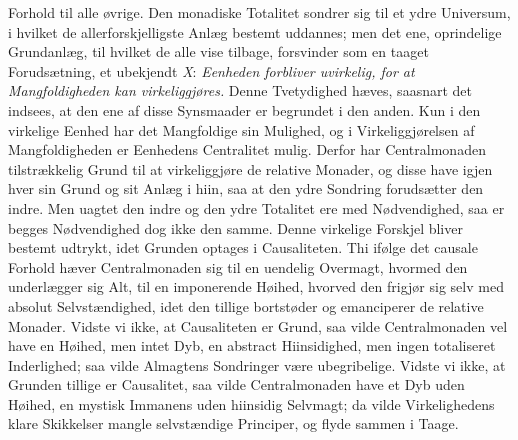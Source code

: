 \documentclass[12pt]{book}
\newcommand{\opage}[1]{\marginnote{\footnotesize\textit{[#1]}}}
\begin{document}
Forhold til alle øvrige. Den monadiske Totalitet sondrer sig til et ydre Universum, i
hvilket de allerforskjelligste Anlæg bestemt uddannes; men det ene, oprindelige
Grundanlæg, til hvilket de alle vise tilbage, forsvinder som en taaget Forudsætning, et
ubekjendt \textit{X}: \emph{Eenheden forbliver uvirkelig, for at Mangfoldigheden kan
virkeliggjøres.} Denne Tvetydighed hæves, saasnart det indsees, at den ene af disse
Synsmaader er begrundet i den anden. Kun i den virkelige Eenhed har det Mangfoldige sin
Mulighed, og i Virkeliggjørelsen af Mangfoldigheden er Eenhedens Centralitet mulig.
Derfor har Centralmonaden tilstrækkelig Grund til at virkeliggjøre de relative Monader,
og disse have igjen hver sin Grund og sit Anlæg i hiin, saa at den ydre Sondring
forudsætter den indre. Men uagtet den indre og den ydre Totalitet ere med Nødvendighed,
saa er begges Nødvendighed dog ikke den samme. Denne virkelige Forskjel bliver bestemt
udtrykt, idet Grunden optages i Causaliteten. Thi ifølge det causale Forhold hæver
Centralmonaden sig til en uendelig
\opage{174} %
%
%
Overmagt, hvormed den underlægger sig Alt, til en imponerende Høihed, hvorved den
frigjør sig selv med absolut Selvstændighed, idet den tillige bortstøder og
emanciperer de relative Monader. Vidste vi ikke, at Causaliteten er Grund, saa vilde
Centralmonaden vel have en Høihed, men intet Dyb, en abstract Hiinsidighed, men ingen
totaliseret Inderlighed; saa vilde Almagtens Sondringer være ubegribelige. Vidste vi
ikke, at Grunden tillige er Causalitet, saa vilde Centralmonaden have et Dyb uden
Høihed, en mystisk Immanens uden hiinsidig Selvmagt; da vilde Virkelighedens klare
Skikkelser mangle selvstændige Principer, og flyde sammen i Taage.
\end{document}
